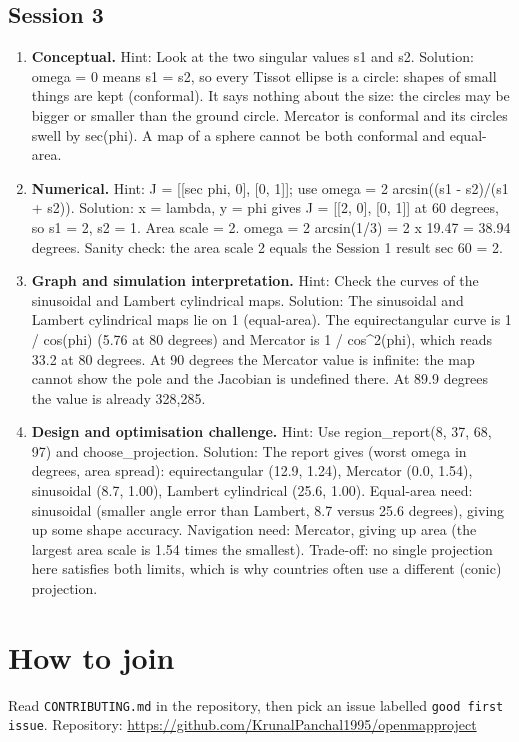 \documentclass[11pt,a4paper]{article}
\begin{document}
\subsection*{Session 3}
\begin{enumerate}[nosep]
\item \textbf{Conceptual.} Hint: Look at the two singular values s1 and s2. Solution: omega = 0 means s1 = s2, so every Tissot ellipse is a circle: shapes of small things are kept (conformal). It says nothing about the size: the circles may be bigger or smaller than the ground circle. Mercator is conformal and its circles swell by sec(phi). A map of a sphere cannot be both conformal and equal-area.
\item \textbf{Numerical.} Hint: J = [[sec phi, 0], [0, 1]]; use omega = 2 arcsin((s1 - s2)/(s1 + s2)). Solution: x = lambda, y = phi gives J = [[2, 0], [0, 1]] at 60 degrees, so s1 = 2, s2 = 1. Area scale = 2. omega = 2 arcsin(1/3) = 2 x 19.47 = 38.94 degrees. Sanity check: the area scale 2 equals the Session 1 result sec 60 = 2.
\item \textbf{Graph and simulation interpretation.} Hint: Check the curves of the sinusoidal and Lambert cylindrical maps. Solution: The sinusoidal and Lambert cylindrical maps lie on 1 (equal-area). The equirectangular curve is 1 / cos(phi) (5.76 at 80 degrees) and Mercator is 1 / cos\textasciicircum{}2(phi), which reads 33.2 at 80 degrees. At 90 degrees the Mercator value is infinite: the map cannot show the pole and the Jacobian is undefined there. At 89.9 degrees the value is already 328,285.
\item \textbf{Design and optimisation challenge.} Hint: Use region\_report(8, 37, 68, 97) and choose\_projection. Solution: The report gives (worst omega in degrees, area spread): equirectangular (12.9, 1.24), Mercator (0.0, 1.54), sinusoidal (8.7, 1.00), Lambert cylindrical (25.6, 1.00). Equal-area need: sinusoidal (smaller angle error than Lambert, 8.7 versus 25.6 degrees), giving up some shape accuracy. Navigation need: Mercator, giving up area (the largest area scale is 1.54 times the smallest). Trade-off: no single projection here satisfies both limits, which is why countries often use a different (conic) projection.
\end{enumerate}

\section{How to join}
Read \texttt{CONTRIBUTING.md} in the repository, then pick an issue labelled \texttt{good first issue}. Repository: \url{https://github.com/KrunalPanchal1995/openmapproject}
\end{document}
